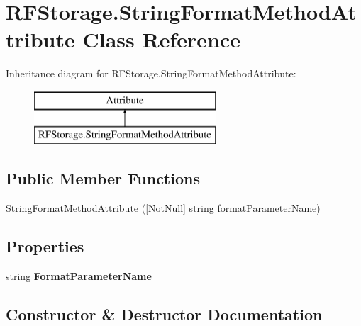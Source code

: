 \hypertarget{class_r_f_storage_1_1_string_format_method_attribute}{}\section{R\+F\+Storage.\+String\+Format\+Method\+Attribute Class Reference}
\label{class_r_f_storage_1_1_string_format_method_attribute}
Inheritance diagram for R\+F\+Storage.\+String\+Format\+Method\+Attribute\+:\begin{figure}[H]
\begin{center}
\leavevmode
\includegraphics[height=2.000000cm]{class_r_f_storage_1_1_string_format_method_attribute}
\end{center}
\end{figure}
\subsection*{Public Member Functions}
\begin{DoxyCompactItemize}
\item 
\mbox{\hyperlink{class_r_f_storage_1_1_string_format_method_attribute_a363c664ef453ba5ff56ee41cb3e1ce3b}{String\+Format\+Method\+Attribute}} (\mbox{[}Not\+Null\mbox{]} string format\+Parameter\+Name)
\end{DoxyCompactItemize}
\subsection*{Properties}
\begin{DoxyCompactItemize}
\item 
\mbox{\label{class_r_f_storage_1_1_string_format_method_attribute_a4549cf506d7a4ee66d169ec7bfac8a28}} 
string {\bfseries Format\+Parameter\+Name}
\end{DoxyCompactItemize}


\subsection{Constructor \& Destructor Documentation}
\mbox{\label{class_r_f_storage_1_1_string_format_method_attribute_a363c664ef453ba5ff56ee41cb3e1ce3b}} 
